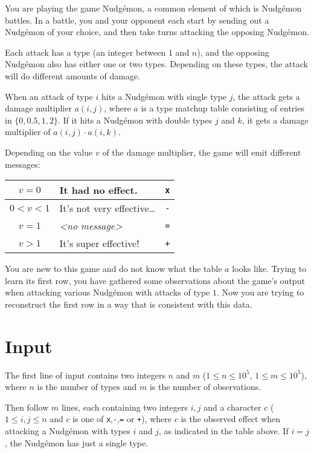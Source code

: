 You are playing the game Nudg\'emon, a common element of which is Nudg\'emon battles.
In a battle, you and your opponent each start by sending out a Nudg\'emon of your choice,
and then take turns attacking the opposing Nudg\'emon.

Each attack has a type (an integer between $1$ and $n$), and the
opposing Nudg\'emon also has either one or two types. Depending on
these types, the attack will do different amounts of damage.

When an attack of type $i$ hits a Nudg\'emon with single type $j$, the
attack gets a damage multiplier $a(i,j)$, where $a$ is a type matchup
table consisting of entries in $\{0, 0.5, 1, 2\}$. If it hits a
Nudg\'emon with double types $j$ and $k$, it gets a damage multiplier
of $a(i,j) \cdot a(i,k)$.

Depending on the value $v$ of the damage multiplier, the game will
emit different messages:

\begin{center}
  \begin{tabular}{ c | l | l }
    $v = 0$ & It had no effect. & \texttt{x} \\ \hline
    $0 < v < 1$ & It's not very effective\ldots & \texttt{-} \\ \hline
    $v = 1$ & \textit{<no message>} & \texttt{=} \\ \hline
    $v > 1$ & It's super effective! & \texttt{+}
  \end{tabular}
\end{center}
\noindent
You are new to this game and do not know what the table $a$ looks like.
Trying to learn its first row, you have gathered some observations
about the game's output when attacking various Nudg\'emon with attacks
of type $1$. Now you are trying to reconstruct the first row in a way
that is consistent with this data.

\section*{Input}

The first line of input contains two integers $n$ and $m$ ($1 \le
n \le 10^5$, $1 \le m \le 10^5$), where $n$ is the number of types and
$m$ is the number of observations.

Then follow $m$ lines, each containing two integers $i,j$ and a
character $c$ ($1 \le i,j \le n$ and $c$ is one
of \texttt{x},\texttt{-},\texttt{=} or \texttt{+}), where $c$ is the
observed effect when attacking a Nudg\'emon with types $i$ and $j$, as
indicated in the table above. If $i = j$, the Nudg\'emon has just a
single type.

